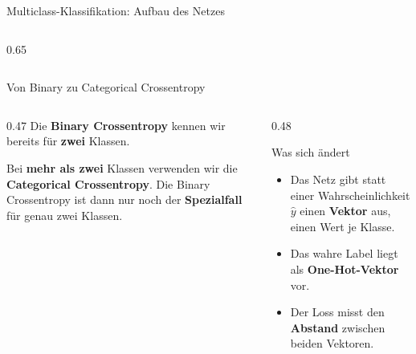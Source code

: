 \begin{frame}{Multiclass-Klassifikation: Aufbau des Netzes}
\begin{columns}
\begin{column}{0.65\textwidth}
{}
\end{column}
\end{columns}
\end{frame} 
\begin{frame}{Von Binary zu Categorical Crossentropy}
\begin{columns}
\begin{column}{0.47\textwidth}
Die \textbf{Binary Crossentropy} kennen wir bereits für \textbf{zwei} Klassen.

\vspace{0.5em}
Bei \textbf{mehr als zwei} Klassen verwenden wir die \textbf{Categorical Crossentropy}. Die Binary Crossentropy ist dann nur noch der \textbf{Spezialfall} für genau zwei Klassen.
\end{column}
\begin{column}{0.48\textwidth}
\begin{block}{Was sich ändert}
\begin{itemize}
\item Das Netz gibt statt einer Wahrscheinlichkeit $\hat{y}$ einen \textbf{Vektor} aus, einen Wert je Klasse.
\item Das wahre Label liegt als \textbf{One-Hot-Vektor} vor.
\item Der Loss misst den \textbf{Abstand} zwischen beiden Vektoren.
\end{itemize}
\end{block}
\end{column}
\end{columns}
\end{frame}

